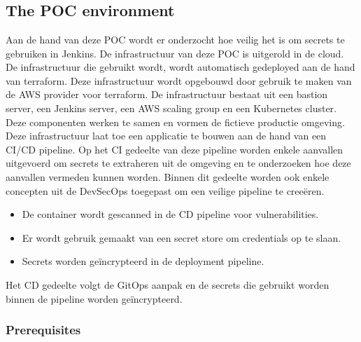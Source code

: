 
\chapter{}%
\label{ch:proof of concept}

\section{
{The POC environment}}
\label{sec:De POC omgeving}

Aan de hand van deze POC wordt er onderzocht hoe veilig het is om secrets te gebruiken in Jenkins. De infrastructuur van deze POC is uitgerold in de cloud. De infrastructuur die gebruikt wordt, wordt automatisch gedeployed aan de hand van terraform. Deze infrastructuur wordt opgebouwd door gebruik te maken van de AWS provider voor terraform. De infrastructuur bestaat uit een bastion server, een Jenkins server, een AWS scaling group en een Kubernetes cluster. Deze componenten werken te samen en vormen de fictieve productie omgeving. Deze infrastructuur laat toe een applicatie te bouwen aan de hand van een CI/CD pipeline. Op het CI gedeelte van deze pipeline worden enkele aanvallen uitgevoerd om secrets te extraheren uit de omgeving en te onderzoeken hoe deze aanvallen vermeden kunnen worden. Binnen dit gedeelte worden ook enkele concepten uit de DevSecOps toegepast om een veilige pipeline te creeëren.

\begin{itemize}
  \item De container wordt gescanned in de CD pipeline voor vulnerabilities.
  \item Er wordt gebruik gemaakt van een secret store om credentials op te slaan.
  \item Secrets worden geïncrypteerd in de deployment pipeline.
\end{itemize}

Het CD gedeelte volgt de GitOps aanpak en de secrets die gebruikt worden binnen de pipeline worden geïncrypteerd.

\subsection{
{Prerequisites}}
\label{sec:Prerequisites}

